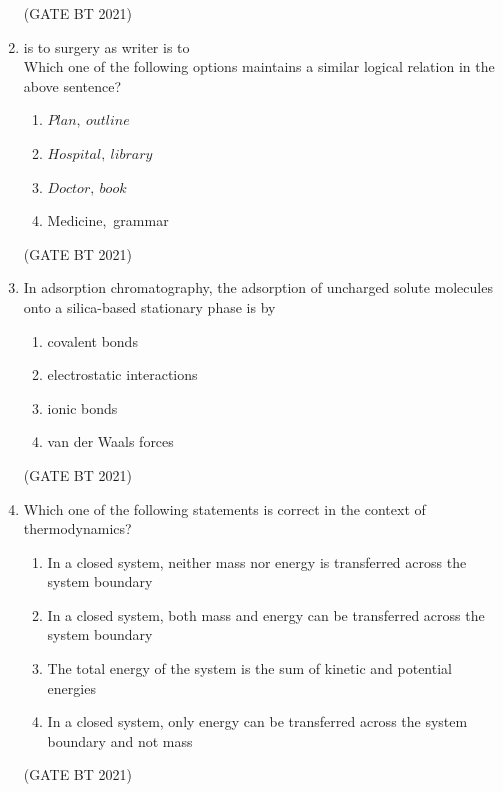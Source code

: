 \documentclass[journal,12pt,onecolumn]{IEEEtran}
\theoremstyle{remark}
\begin{document}
\begin{enumerate}
\hfill (GATE BT 2021)

\item is to surgery as writer is to \\
Which one of the following options maintains a similar logical relation in the above sentence?

\begin{enumerate}
\item $Plan,\ outline$
\item $Hospital,\ library$
\item $Doctor,\ book$
\item Medicine,\ grammar
\end{enumerate}

\hfill (GATE BT 2021)

\item In adsorption chromatography, the adsorption of uncharged solute molecules onto a silica-based stationary phase is by
\begin{enumerate}
    \item covalent bonds
    \item electrostatic interactions
    \item ionic bonds
    \item van der Waals forces
\end{enumerate}
\hfill (GATE BT 2021)

\item Which one of the following statements is correct in the context of thermodynamics?
\begin{enumerate}
    \item In a closed system, neither mass nor energy is transferred across the system boundary
    \item In a closed system, both mass and energy can be transferred across the system boundary
    \item The total energy of the system is the sum of kinetic and potential energies
    \item In a closed system, only energy can be transferred across the system boundary and not mass
\end{enumerate}
\hfill (GATE BT 2021)


\end{enumerate}
\end{document}
